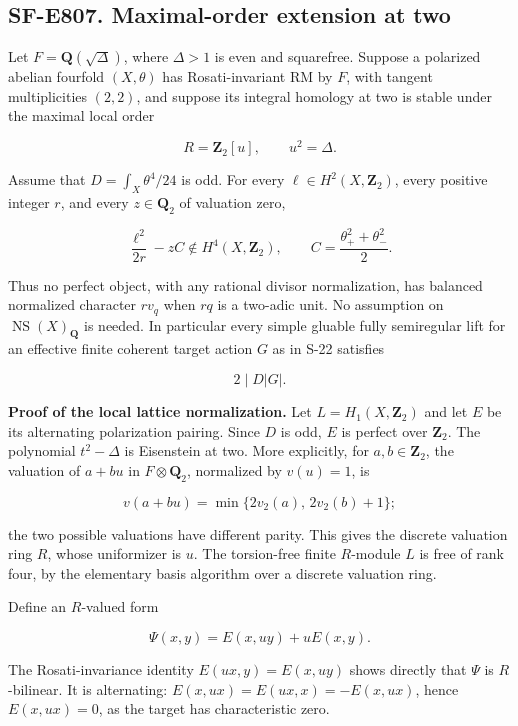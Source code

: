 \subsection{SF-E807. Maximal-order extension at
two}\label{SF-E807}

Let \(F=\mathbf Q(\sqrt{\Delta})\), where \(\Delta>1\) is even and
squarefree. Suppose a polarized abelian fourfold \((X,\theta)\) has
Rosati-invariant RM by \(F\), with tangent multiplicities \((2,2)\), and
suppose its integral homology at two is stable under the maximal local
order

\[
 R=\mathbf Z_2[u],\qquad u^2=\Delta.
\]

Assume that \(D=\int_X\theta^4/24\) is odd. For every
\(\ell\in H^2(X,\mathbf Z_2)\), every positive integer \(r\), and every
\(z\in\mathbf Q_2\) of valuation zero,

\[
 \frac{\ell^2}{2r}-zC\notin H^4(X,\mathbf Z_2),\qquad
 C=\frac{\theta_+^2+\theta_-^2}{2}.
 \tag{E807.1}
\]

Thus no perfect object, with any rational divisor normalization, has
balanced normalized character \(r v_q\) when \(rq\) is a two-adic unit.
No assumption on \(\operatorname{NS}(X)_{\mathbf Q}\) is needed. In
particular every simple gluable fully semiregular lift for an effective
finite coherent target action \(G\) as in S-22 satisfies

\[
 2\mid D|G|.
 \tag{E807.2}
\]

\textbf{Proof of the local lattice normalization.} Let
\(L=H_1(X,\mathbf Z_2)\) and let \(E\) be its alternating polarization
pairing. Since \(D\) is odd, \(E\) is perfect over \(\mathbf Z_2\). The
polynomial \(t^2-\Delta\) is Eisenstein at two. More explicitly, for
\(a,b\in\mathbf Z_2\), the valuation of \(a+bu\) in
\(F\otimes\mathbf Q_2\), normalized by \(v(u)=1\), is

\[
 v(a+bu)=\min\{2v_2(a),\,2v_2(b)+1\};
\]

the two possible valuations have different parity. This gives the
discrete valuation ring \(R\), whose uniformizer is \(u\). The
torsion-free finite \(R\)-module \(L\) is free of rank four, by the
elementary basis algorithm over a discrete valuation ring.

Define an \(R\)-valued form

\[
 \Psi(x,y)=E(x,uy)+uE(x,y).
 \tag{E807.3}
\]

The Rosati-invariance identity \(E(ux,y)=E(x,uy)\) shows directly that
\(\Psi\) is \(R\)-bilinear. It is alternating:
\(E(x,ux)=E(ux,x)=-E(x,ux)\), hence \(E(x,ux)=0\), as the target has
characteristic zero.

